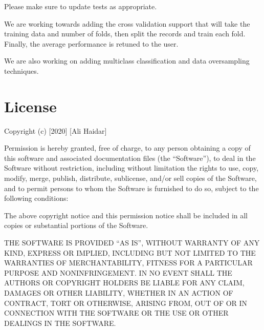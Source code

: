 \documentclass[letterpaper,10pt,english]{sphinxmanual}
\begin{document}
Please make sure to update tests as appropriate.

We are working towards adding the cross validation support that will take the training data and number of folds, then split the records and train each fold. Finally, the average performance is retuned to the user.

We are also working on adding multi\sphinxhyphen{}class classification and data oversampling techniques.


\chapter{License}
\label{\detokenize{index:license}}
Copyright (c) {[}2020{]} {[}Ali Haidar{]}

Permission is hereby granted, free of charge, to any person obtaining a copy
of this software and associated documentation files (the “Software”), to deal
in the Software without restriction, including without limitation the rights
to use, copy, modify, merge, publish, distribute, sublicense, and/or sell
copies of the Software, and to permit persons to whom the Software is
furnished to do so, subject to the following conditions:

The above copyright notice and this permission notice shall be included in all
copies or substantial portions of the Software.

THE SOFTWARE IS PROVIDED “AS IS”, WITHOUT WARRANTY OF ANY KIND, EXPRESS OR
IMPLIED, INCLUDING BUT NOT LIMITED TO THE WARRANTIES OF MERCHANTABILITY,
FITNESS FOR A PARTICULAR PURPOSE AND NONINFRINGEMENT. IN NO EVENT SHALL THE
AUTHORS OR COPYRIGHT HOLDERS BE LIABLE FOR ANY CLAIM, DAMAGES OR OTHER
LIABILITY, WHETHER IN AN ACTION OF CONTRACT, TORT OR OTHERWISE, ARISING FROM,
OUT OF OR IN CONNECTION WITH THE SOFTWARE OR THE USE OR OTHER DEALINGS IN THE
SOFTWARE.



\renewcommand{\indexname}{Index}
\printindex
\end{document}
